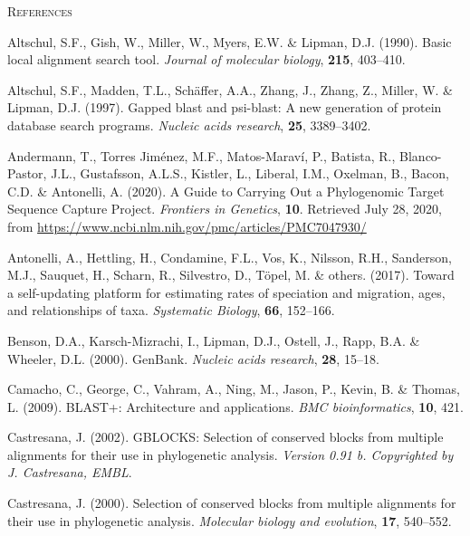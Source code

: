 \documentclass[]{article}
\begin{document}
\newpage
\begin{center}
\textsc{References}
\end{center}

\hypertarget{refs}{}
\leavevmode\hypertarget{ref-altschul1990basic}{}%
Altschul, S.F., Gish, W., Miller, W., Myers, E.W. \& Lipman, D.J. (1990). Basic local alignment search tool. \emph{Journal of molecular biology}, \textbf{215}, 403--410.

\leavevmode\hypertarget{ref-altschul1997gapped}{}%
Altschul, S.F., Madden, T.L., Schäffer, A.A., Zhang, J., Zhang, Z., Miller, W. \& Lipman, D.J. (1997). Gapped blast and psi-blast: A new generation of protein database search programs. \emph{Nucleic acids research}, \textbf{25}, 3389--3402.

\leavevmode\hypertarget{ref-andermann2020guide}{}%
Andermann, T., Torres Jiménez, M.F., Matos-Maraví, P., Batista, R., Blanco-Pastor, J.L., Gustafsson, A.L.S., Kistler, L., Liberal, I.M., Oxelman, B., Bacon, C.D. \& Antonelli, A. (2020). A Guide to Carrying Out a Phylogenomic Target Sequence Capture Project. \emph{Frontiers in Genetics}, \textbf{10}. Retrieved July 28, 2020, from \url{https://www.ncbi.nlm.nih.gov/pmc/articles/PMC7047930/}

\leavevmode\hypertarget{ref-antonelli2017toward}{}%
Antonelli, A., Hettling, H., Condamine, F.L., Vos, K., Nilsson, R.H., Sanderson, M.J., Sauquet, H., Scharn, R., Silvestro, D., Töpel, M. \& others. (2017). Toward a self-updating platform for estimating rates of speciation and migration, ages, and relationships of taxa. \emph{Systematic Biology}, \textbf{66}, 152--166.

\leavevmode\hypertarget{ref-benson2000genbank}{}%
Benson, D.A., Karsch-Mizrachi, I., Lipman, D.J., Ostell, J., Rapp, B.A. \& Wheeler, D.L. (2000). GenBank. \emph{Nucleic acids research}, \textbf{28}, 15--18.

\leavevmode\hypertarget{ref-camacho2009blast}{}%
Camacho, C., George, C., Vahram, A., Ning, M., Jason, P., Kevin, B. \& Thomas, L. (2009). BLAST+: Architecture and applications. \emph{BMC bioinformatics}, \textbf{10}, 421.

\leavevmode\hypertarget{ref-castresana2002gblocks}{}%
Castresana, J. (2002). GBLOCKS: Selection of conserved blocks from multiple alignments for their use in phylogenetic analysis. \emph{Version 0.91 b. Copyrighted by J. Castresana, EMBL}.

\leavevmode\hypertarget{ref-castresana2000selection}{}%
Castresana, J. (2000). Selection of conserved blocks from multiple alignments for their use in phylogenetic analysis. \emph{Molecular biology and evolution}, \textbf{17}, 540--552.
\end{document}
